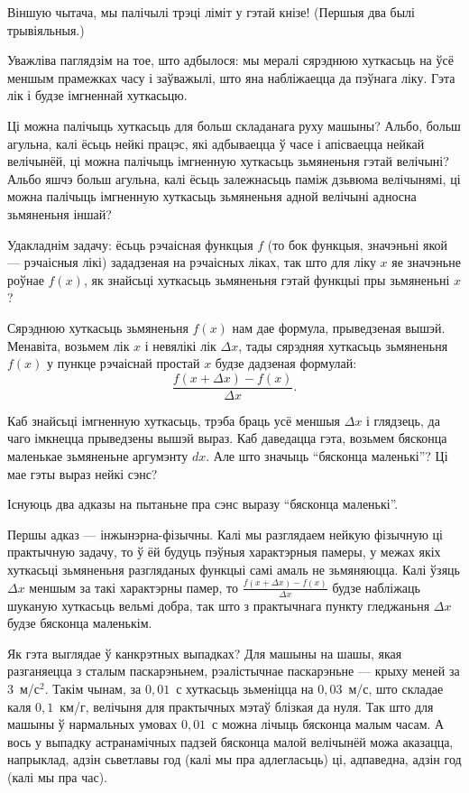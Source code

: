 \documentclass[10pt,a4paper]{book}
\theoremstyle{plain}
\begin{document}
Віншую чытача, мы палічылі трэці ліміт у гэтай кнізе! (Першыя два былі трывіяльныя.)

Уважліва паглядзім на тое, што адбылося: мы мералі сярэднюю хуткасьць на ўсё
меншым прамежках часу і заўважылі, што яна набліжаецца да пэўнага ліку. Гэта лік
і будзе імгненнай хуткасьцю.

Ці можна палічыць хуткасьць для больш складанага руху машыны? Альбо, больш
агульна, калі ёсьць нейкі працэс, які адбываецца ў часе і апісваецца нейкай
велічынёй, ці можна палічыць імгненную хуткасьць зьмяненьня гэтай велічыні?
Альбо яшчэ больш агульна, калі ёсьць залежнасьць паміж дзьвюма велічынямі, ці
можна палічыць імгненную хуткасьць зьмяненьня адной велічыні адносна зьмяненьня
іншай?

Удакладнім задачу: ёсьць рэчаісная функцыя $f$ (то бок функцыя, значэньні якой
--- рэчаісныя лікі) зададзеная на рэчаісных ліках, так што для ліку $x$ яе
значэньне роўнае $f(x)$, як знайсьці хуткасьць зьмяненьня гэтай функцыі пры
зьмяненьні $x$?

Сярэднюю хуткасьць зьмяненьня $f(x)$ нам дае формула, прыведзеная
вышэй. Менавіта, возьмем лік $x$ і невялікі лік $\Delta x$, тады сярэдняя
хуткасьць зьмяненьня $f(x)$ у пункце рэчаіснай простай $x$ будзе дадзеная
формулай:
\begin{equation*}
  \frac{f(x + \Delta x) - f(x)}{\Delta x}.
\end{equation*}

Каб знайсьці імгненную хуткасьць, трэба браць усё меншыя $\Delta x$ і глядзець,
да чаго імкнецца прыведзены вышэй выраз. Каб даведацца гэта, возьмем бясконца
маленькае зьмяненьне аргумэнту $dx$. Але што значыць ``бясконца маленькі''? Ці
мае гэты выраз нейкі сэнс?

Існуюць два адказы на пытаньне пра сэнс выразу ``бясконца маленькі''.

Першы адказ --- ін\-жы\-нэр\-на-фі\-зыч\-ны. Калі мы разглядаем нейкую фізычную
ці практычную задачу, то ў ёй будуць пэўныя характэрныя памеры, у межах якіх
хуткасьці зьмяненьня разгляданых функцыі самі амаль не зьмяняюцца. Калі ўзяць
$\Delta x$ меншым за такі характэрны памер, то $\frac{f(x + \Delta x) -
  f(x)}{\Delta x}$ будзе набліжаць шуканую хуткасьць вельмі добра, так што з
практычнага пункту гледжаньня $\Delta x$ будзе бясконца маленькім.

Як гэта выглядае ў канкрэтных выпадках? Для машыны на шашы, якая разганяецца з
сталым паскарэньнем, рэалістычнае паскарэньне --- крыху меней за
$3$~м/с$^2$. Такім чынам, за $0,01$~с хуткасьць зьменіцца на $0,03$~м/с, што
складае каля $0,1$~км/г, велічыня для практычных мэтаў блізкая да нуля. Так што
для машыны ў нармальных умовах $0,01$~с можна лічыць бясконца малым часам. А
вось у выпадку астранамічных падзей бясконца малой велічынёй можа аказацца,
напрыклад, адзін сьветлавы год (калі мы пра адлегласьць) ці, адпаведна, адзін
год (калі мы пра час).
\end{document}
